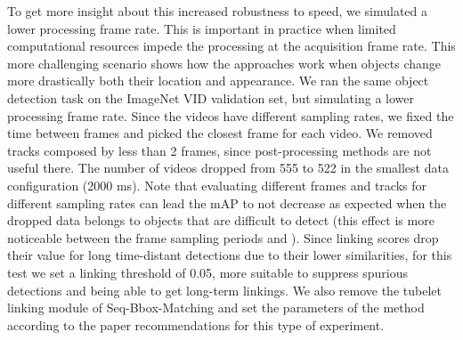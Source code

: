 \documentclass[letterpaper, 10 pt, conference]{ieeeconf}
\begin{document}
To get more insight about this increased robustness to speed, we simulated a lower processing frame rate. This is 
important in practice when limited computational resources impede the processing at the acquisition frame rate. 
This more challenging scenario 
shows how the approaches work when objects change more drastically both their location and appearance. 
We ran the same object detection task on the ImageNet VID validation set, but simulating a lower processing frame rate. Since the videos have different sampling rates, we fixed the time between frames and picked the closest frame for each video.  
We removed tracks composed by less than 2 frames, since post-processing methods are not useful there. The number of videos dropped from 555 to 522 in the smallest data configuration (2000 ms). 
Note that evaluating different frames and tracks for different sampling rates can lead the mAP to not decrease as expected when the dropped data belongs to objects that are difficult to detect (this effect is more noticeable between the frame sampling periods  and ).
Since linking scores drop their value for long time-distant detections due to their lower similarities, for this test we set a linking threshold of 0.05,
more suitable to suppress spurious detections and being able to get long-term linkings. We also remove the tubelet linking module of Seq-Bbox-Matching and set the parameters of the method according to the paper recommendations for this type of experiment.
\end{document}
